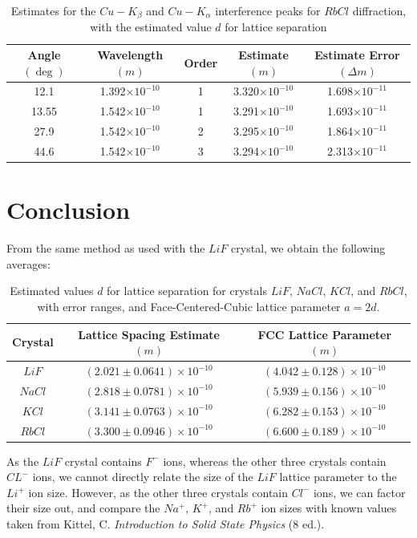 \documentclass[a4paper]{article}
\begin{document}
\begin{table}[h!]
\centering
\begin{tabular}{ccccc}
\hline
Angle $(\deg)$ & Wavelength $(m)$ & Order & Estimate $(m)$ & Estimate Error $(\Delta m)$\\ \hline
12.1 & 1.392$\times10^{-10}$ & 1 & 3.320$\times10^{-10}$ & 1.698$\times10^{-11}$ \\
13.55 & 1.542$\times10^{-10}$ & 1 & 3.291$\times10^{-10}$ & 1.693$\times10^{-11}$ \\
27.9 & 1.542$\times10^{-10}$ & 2 & 3.295$\times10^{-10}$ & 1.864$\times10^{-11}$ \\
44.6 & 1.542$\times10^{-10}$ & 3 & 3.294$\times10^{-10}$ & 2.313$\times10^{-11}$ \\
\end{tabular}
\caption{\label{tab:rbcl}Estimates for the $Cu-K_\beta$ and $Cu-K_\alpha$ interference peaks for $RbCl$ diffraction, with the estimated value $d$ for lattice separation}
\end{table}
\newpage
\section{Conclusion}
From the same method as used with the $LiF$ crystal, we obtain the following averages:

\begin{table}[h!]
\centering
\begin{tabular}{ccc}
\hline
Crystal & Lattice Spacing Estimate $(m)$ & FCC Lattice Parameter $(m)$ \\ \hline
$LiF$ & $(2.021\pm0.0641)\times10^{-10}$ & $(4.042\pm0.128)\times10^{-10}$ \\
$NaCl$ & $(2.818\pm0.0781)\times10^{-10}$ & $(5.939\pm0.156)\times10^{-10}$ \\
$KCl$ & $(3.141\pm0.0763)\times10^{-10}$ & $(6.282\pm0.153)\times10^{-10}$ \\
$RbCl$ & $(3.300\pm0.0946)\times10^{-10}$ & $(6.600\pm0.189)\times10^{-10}$ \\
\end{tabular}
\caption{\label{tab:results}Estimated values $d$ for lattice separation for crystals $LiF$, $NaCl$, $KCl$, and $RbCl$, with error ranges, and Face-Centered-Cubic lattice parameter $a=2d$.}
\end{table}

As the $LiF$ crystal contains $F^-$ ions, whereas the other three crystals contain $CL^-$ ions, we cannot directly relate the size of the $LiF$ lattice parameter to the $Li^+$ ion size. However, as the other three crystals contain $Cl^-$ ions, we can factor their size out, and compare the $Na^+$, $K^+$, and $Rb^+$ ion sizes with known values taken from Kittel, C. {\it Introduction to Solid State Physics} (8 ed.).
\end{document}
